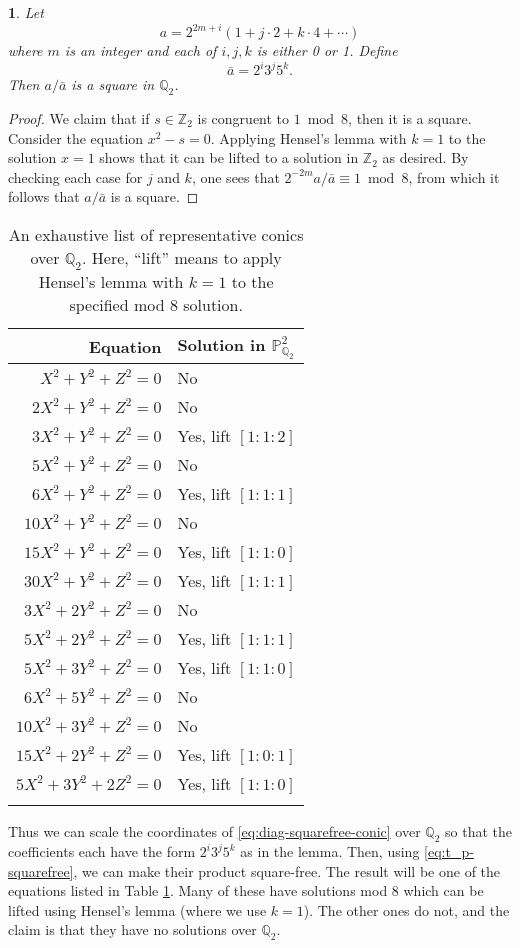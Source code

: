 \documentclass[10pt,a4paper]{amsart}
\numberwithin{equation}{section}
\numberwithin{figure}{section}
\numberwithin{table}{section}
\theoremstyle{definition}
\theoremstyle{plain}
\theoremstyle{remark}
\theoremstyle{plain}
\theoremstyle{definition}
\theoremstyle{plain}
\theoremstyle{plain}
\newtheorem{lem}[thm]{\protect\lemmaname}
\providecommand{\lemmaname}{Lemma}
\renewcommand{\P}{\mathbb{P}}
\newcommand{\Z}{\mathbb{Z}}
\newcommand{\Q}{\mathbb{Q}}
\begin{document}
	\begin{lem}\label{lem:squares-in-Q2}
		Let
		\[
		a = 2^{2m + i}(1 + j\cdot 2 + k \cdot 4+ \cdots)
		\]
		where $m$ is an integer and each of $i,j,k$ is either 0 or 1. Define
		\[
		\bar{a} = 2^i 3^j 5^k.
		\]
		Then $a/\bar{a}$ is a square in $\Q_2$.
	\end{lem}
	\begin{proof}
		We claim that if $s\in \Z_2$ is congruent to $1\bmod 8$, then it is a square. Consider the equation $x^2 - s=0$. Applying Hensel's lemma with $k=1$ to the solution $x = 1$ shows that it can be lifted to a solution in $\Z_2$ as desired.
		By checking each case for $j$ and $k$, one sees that $2^{-2m} a/\bar{a} \equiv 1 \bmod 8$, from which it follows that $a/\bar{a}$ is a square.
	\end{proof}
	\begin{table}[h]
		\begin{tabular}{r@{\hskip 18pt}l}
			\toprule
			Equation & Solution in $\P^2_{\Q_2}$\\
			\midrule
			$X^2 + Y^2 + Z^2 = 0$ & No \\ 
			$2X^2 + Y^2 + Z^2 = 0$ & No \\ 
			$3X^2 + Y^2 + Z^2 = 0$ & Yes, lift $[1:1:2]$ \\ 
			$5X^2 + Y^2 + Z^2 = 0$ & No \\ 
			$6X^2 + Y^2 + Z^2 = 0$ & Yes, lift $[1:1:1]$ \\ 
			$10X^2 + Y^2 + Z^2 = 0$ & No \\ 
			$15X^2 + Y^2 + Z^2 = 0$ & Yes, lift $[1:1:0]$ \\ 
			$30X^2 + Y^2 + Z^2 = 0$ & Yes, lift $[1:1:1]$ \\ 
			$3X^2 + 2Y^2 + Z^2 = 0$ & No \\
			$5X^2 + 2Y^2 + Z^2 = 0$ & Yes, lift $[1:1:1]$ \\ 
			$5X^2 + 3Y^2 + Z^2 = 0$ & Yes, lift $[1:1:0]$ \\ 
			$6X^2 + 5Y^2 + Z^2 = 0$ & No \\ 
			$10X^2 + 3Y^2 + Z^2 = 0$ & No \\ 
			$15X^2 + 2Y^2 + Z^2 = 0$ & Yes, lift $[1:0:1]$ \\ 
			$5X^2 + 3Y^2 + 2Z^2 = 0$ & Yes, lift $[1:1:0]$ \\ 
			\bottomrule
			\multicolumn{2}{c}{}
		\end{tabular}
		
		\caption{An exhaustive list of representative conics over $\Q_2$. Here, ``lift'' means to apply Hensel's lemma with $k=1$ to the specified mod 8 solution.}
		\label{table:Q2-diag-conics}
	\end{table}
	Thus we can scale the coordinates of \eqref{eq:diag-squarefree-conic} over $\Q_2$ so that the coefficients each have the form $2^i 3^j 5^k$ as in the lemma. Then, using \eqref{eq:t_p-squarefree}, we can make their product square-free. The result will be one of the equations listed in Table \ref{table:Q2-diag-conics}. Many of these have solutions mod 8 which can be lifted using Hensel's lemma (where we use $k=1$). The other ones do not, and the claim is that they have no solutions over $\Q_2$.
	
\end{document}
